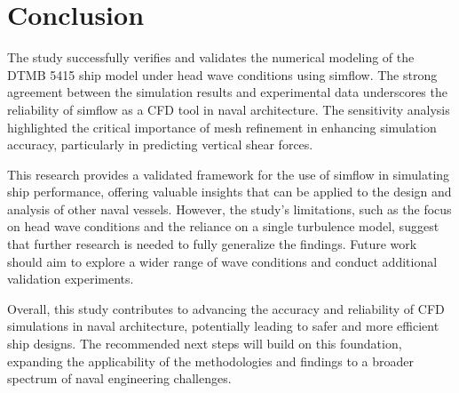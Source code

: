\documentclass[12pt]{article} %
\begin{document}
\section{Conclusion}
The study successfully verifies and validates the numerical modeling of the DTMB 5415 ship model 
under head wave conditions using simflow. The strong agreement between the simulation results and 
experimental data underscores the reliability of simflow as a CFD tool in naval architecture. The 
sensitivity analysis highlighted the critical importance of mesh refinement in enhancing simulation 
accuracy, particularly in predicting vertical shear forces.

This research provides a validated framework for the use of simflow in simulating ship performance, 
offering valuable insights that can be applied to the design and analysis of other naval vessels. 
However, the study's limitations, such as the focus on head wave conditions and the reliance on a 
single turbulence model, suggest that further research is needed to fully generalize the findings. 
Future work should aim to explore a wider range of wave conditions and conduct additional validation experiments.

Overall, this study contributes to advancing the accuracy and reliability of CFD simulations in 
naval architecture, potentially leading to safer and more efficient ship designs. The recommended 
next steps will build on this foundation, expanding the applicability of the methodologies and 
findings to a broader spectrum of naval engineering challenges.
\end{document}
